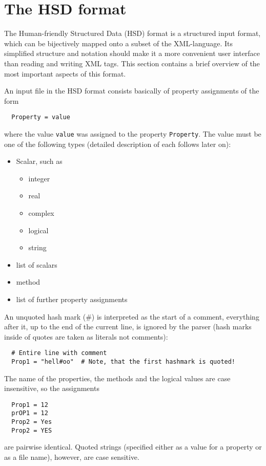 \chapter{The HSD format}
\label{sec:hsd}

The Human-friendly Structured Data (HSD) format is a structured input
format, which can be bijectively mapped onto a subset of the
XML-language. Its simplified structure and notation should make it a
more convenient user interface than reading and writing XML tags. This
section contains a brief overview of the most important aspects of
this format.

An input file in the HSD format consists basically of property
assignments of the form
\begin{verbatim}
  Property = value
\end{verbatim}
where the value \verb|value| was assigned to the property
\verb|Property|.  The value must be one of the following types
(detailed description of each follows later on):
\begin{itemize}
\item Scalar, such as
  \begin{itemize}
  \item integer
  \item real
  \item complex
  \item logical
  \item string
  \end{itemize}
\item list of scalars
\item method
\item list of further property assignments
\end{itemize}

An unquoted hash mark (\#) is interpreted as the start of a comment,
everything after it, up to the end of the current line, is ignored by
the parser (hash marks inside of quotes are taken as literals not
comments):
\begin{verbatim}
  # Entire line with comment
  Prop1 = "hell#oo"  # Note, that the first hashmark is quoted!
\end{verbatim}
The name of the properties, the methods and the logical values are case
insensitive, so the assignments
\begin{verbatim}
  Prop1 = 12
  prOP1 = 12
  Prop2 = Yes
  Prop2 = YES
\end{verbatim}
are pairwise identical. Quoted strings (specified either as a value
for a property or as a file name), however, are case sensitive.

